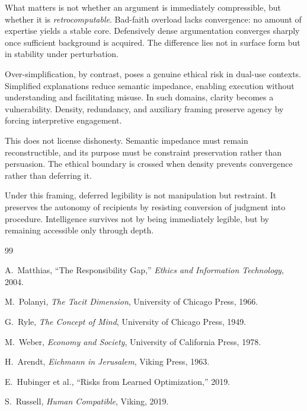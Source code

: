 What matters is not whether an argument is immediately compressible, but whether it is \emph{retrocomputable}. Bad-faith overload lacks convergence: no amount of expertise yields a stable core. Defensively dense argumentation converges sharply once sufficient background is acquired. The difference lies not in surface form but in stability under perturbation.

Over-simplification, by contrast, poses a genuine ethical risk in dual-use contexts. Simplified explanations reduce semantic impedance, enabling execution without understanding and facilitating misuse. In such domains, clarity becomes a vulnerability. Density, redundancy, and auxiliary framing preserve agency by forcing interpretive engagement.

This does not license dishonesty. Semantic impedance must remain reconstructible, and its purpose must be constraint preservation rather than persuasion. The ethical boundary is crossed when density prevents convergence rather than deferring it.

Under this framing, deferred legibility is not manipulation but restraint. It preserves the autonomy of recipients by resisting conversion of judgment into procedure. Intelligence survives not by being immediately legible, but by remaining accessible only through depth.



\begin{thebibliography}{99}

A.~Matthias, ``The Responsibility Gap,'' \emph{Ethics and Information Technology}, 2004.

M.~Polanyi, \emph{The Tacit Dimension}, University of Chicago Press, 1966.

G.~Ryle, \emph{The Concept of Mind}, University of Chicago Press, 1949.

M.~Weber, \emph{Economy and Society}, University of California Press, 1978.

H.~Arendt, \emph{Eichmann in Jerusalem}, Viking Press, 1963.

E.~Hubinger et al., ``Risks from Learned Optimization,'' 2019.

S.~Russell, \emph{Human Compatible}, Viking, 2019.

\end{thebibliography}



